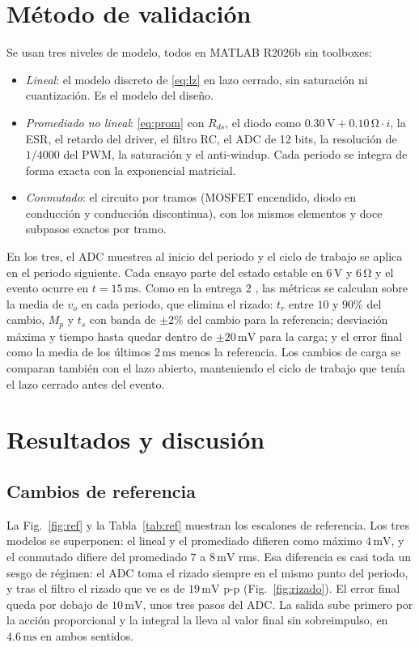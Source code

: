 \documentclass[conference,letterpaper]{IEEEtran}
\newcommand{\unit}[1]{\,\mathrm{#1}}
\begin{document}
\section{Método de validación}\label{sec:metodo}
Se usan tres niveles de modelo, todos en MATLAB R2026b \cite{matlab} sin toolboxes:
\begin{itemize}
\item \emph{Lineal}: el modelo discreto de \eqref{eq:lz} en lazo cerrado, sin saturación ni cuantización. Es el modelo del diseño.
\item \emph{Promediado no lineal}: \eqref{eq:prom} con $R_{ds}$, el diodo como $0.30\unit{V}+0.10\unit{\Omega}\cdot i$, la ESR, el retardo del driver, el filtro RC, el ADC de 12 bits, la resolución de $1/4000$ del PWM, la saturación y el anti-windup. Cada periodo se integra de forma exacta con la exponencial matricial.
\item \emph{Conmutado}: el circuito por tramos (MOSFET encendido, diodo en conducción y conducción discontinua), con los mismos elementos y doce subpasos exactos por tramo.
\end{itemize}
En los tres, el ADC muestrea al inicio del periodo y el ciclo de trabajo se aplica en el periodo siguiente. Cada ensayo parte del estado estable en $6\unit{V}$ y $6\unit{\Omega}$ y el evento ocurre en $t=15\unit{ms}$. Como en la entrega 2 \cite{e2}, las métricas se calculan sobre la media de $v_o$ en cada periodo, que elimina el rizado: $t_r$ entre $10$ y $90\%$ del cambio, $M_p$ y $t_s$ con banda de $\pm2\%$ del cambio para la referencia; desviación máxima y tiempo hasta quedar dentro de $\pm20\unit{mV}$ para la carga; y el error final como la media de los últimos $2\unit{ms}$ menos la referencia. Los cambios de carga se comparan también con el lazo abierto, manteniendo el ciclo de trabajo que tenía el lazo cerrado antes del evento.

\section{Resultados y discusión}\label{sec:res}
\subsection{Cambios de referencia}
La Fig.~\ref{fig:ref} y la Tabla~\ref{tab:ref} muestran los escalones de referencia. Los tres modelos se superponen: el lineal y el promediado difieren como máximo $4\unit{mV}$, y el conmutado difiere del promediado $7$ a $8\unit{mV}$ rms. Esa diferencia es casi toda un sesgo de régimen: el ADC toma el rizado siempre en el mismo punto del periodo, y tras el filtro el rizado que ve es de $19\unit{mV}$ p-p (Fig.~\ref{fig:rizado}). El error final queda por debajo de $10\unit{mV}$, unos tres pasos del ADC. La salida sube primero por la acción proporcional y la integral la lleva al valor final sin sobreimpulso, en $4.6\unit{ms}$ en ambos sentidos.
\end{document}
